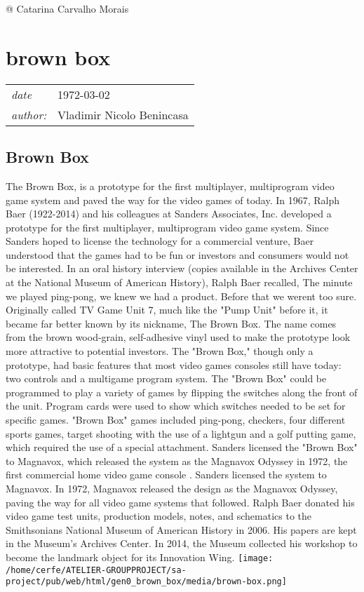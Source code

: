 \documentclass[a4paper,10pt]{book}
\newcommand{\pageHeader}[4]{
    \section{#1}
    \vspace{-0.3cm}
    \begin{table}[h!]
     \begin{tabular}{ll}
        \hline
        \textit{date} & #2 \\
        \textit{author: } & #3\\
        \hline
     \end{tabular}
    \end{table}
    \vspace{-0.3cm}
}
\begin{document}
 
 
 @ Catarina Carvalho Morais 
 
 \newpage\pageHeader{brown box}{1972-03-02}{Vladimir Nicolo Benincasa}{Brown Box - prototype of the firs console}
 \subsection{Brown Box }
 
          The Brown Box, is a prototype for the first multiplayer, multiprogram video game system and  paved the way for the video games of today.
In 1967, Ralph Baer (1922-2014) and his colleagues at Sanders Associates, Inc. developed a prototype for the first multiplayer, multiprogram video game system. Since Sanders hoped to license the technology for a commercial venture, Baer understood that the games had to be fun or investors and consumers would not be interested. In an oral history interview (copies available in the Archives Center at the National Museum of American History), Ralph Baer recalled, The minute we played ping-pong, we knew we had a product. Before that we werent too sure.
Originally called TV Game Unit 7, much like the "Pump Unit" before it, it became far better known by its nickname, The Brown Box. The name comes from the brown wood-grain, self-adhesive vinyl used to make the prototype look more attractive to potential investors. The "Brown Box," though only a prototype, had basic features that most video games consoles still have today: two controls and a multigame program system.
The "Brown Box" could be programmed to play a variety of games by flipping the switches along the front of the unit. Program cards were used to show which switches needed to be set for specific games. "Brown Box" games included ping-pong, checkers, four different sports games, target shooting with the use of a lightgun and a golf putting game, which required the use of a special attachment.
Sanders licensed the "Brown Box" to Magnavox, which released the system as the Magnavox Odyssey in 1972, the first commercial home video game console .
Sanders licensed the system to Magnavox. In 1972, Magnavox released the design as the Magnavox Odyssey, paving the way for all video game systems that followed.
Ralph Baer donated his video game test units, production models, notes, and schematics to the Smithsonians National Museum of American History in 2006. His papers are kept in the Museum's Archives Center. In 2014, the Museum collected his workshop to become the landmark object for its Innovation Wing.
 \texttt{[image: /home/cerfe/ATELIER-GROUPPROJECT/sa-project/pub/web/html/gen0\_brown\_box/media/brown-box.png]}
 
\end{document}
